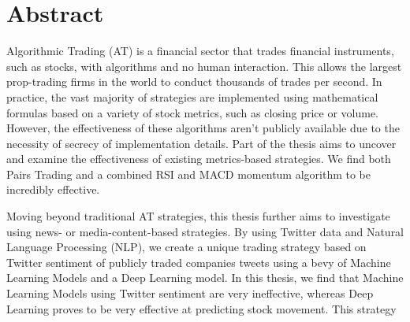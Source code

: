 \documentclass[../thesis.tex]{subfiles}
\begin{document}
\chapter*{Abstract}

Algorithmic Trading (AT) is a financial sector that trades financial instruments, such as stocks, with algorithms and no human interaction. This allows the largest prop-trading firms in the world to conduct thousands of trades per second. In practice, the vast majority of strategies are implemented using mathematical formulas based on a variety of stock metrics, such as closing price or volume. However, the effectiveness of these algorithms aren't publicly available due to the necessity of secrecy of implementation details. Part of the thesis aims to uncover and examine the effectiveness of existing metrics-based strategies. We find both Pairs Trading and a combined RSI and MACD momentum algorithm to be incredibly effective.

Moving beyond traditional AT strategies, this thesis further aims to investigate using news- or media-content-based strategies. By using Twitter data and Natural Language Processing (NLP), we create a unique trading strategy based on Twitter sentiment of publicly traded companies tweets using a bevy of Machine Learning Models and a Deep Learning model. In this thesis, we find that Machine Learning Models using Twitter sentiment are very ineffective, whereas Deep Learning proves to be very effective at predicting stock movement. This strategy 
\end{document}
